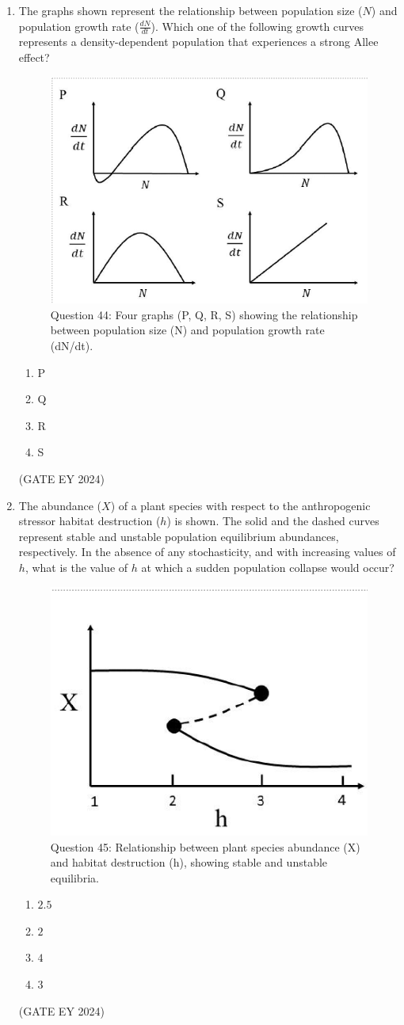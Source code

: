 \documentclass[journal]{IEEEtran}
\begin{document}
\begin{enumerate}
\item The graphs shown represent the relationship between population size ($N$) and population growth rate ($\frac{dN}{dt}$). Which one of the following growth curves represents a density-dependent population that experiences a strong Allee effect?
\begin{figure}[!ht]
    \centering
    \includegraphics[width=0.3\columnwidth]{figs/Q-44.png}
    \caption{Question 44: Four graphs (P, Q, R, S) showing the relationship between population size (N) and population growth rate (dN/dt).}
    \label{Q.44}
\end{figure}
    \begin{multicols}{4}
    \begin{enumerate}
        \item P
        \item Q
        \item R
        \item S
    \end{enumerate}
    \end{multicols}
\hfill{(GATE EY 2024)}

\item The abundance ($X$) of a plant species with respect to the anthropogenic stressor habitat destruction ($h$) is shown. The solid and the dashed curves represent stable and unstable population equilibrium abundances, respectively. In the absence of any stochasticity, and with increasing values of $h$, what is the value of $h$ at which a sudden population collapse would occur?
\begin{figure}[!ht]
    \centering
    \includegraphics[width=0.3\columnwidth]{figs/Q-45.png}
    \caption{Question 45: Relationship between plant species abundance (X) and habitat destruction (h), showing stable and unstable equilibria.}
    \label{Q.45}
\end{figure}
    \begin{multicols}{4}
    \begin{enumerate}
        \item $2.5$
        \item $2$
        \item $4$
        \item $3$
    \end{enumerate}
    \end{multicols}
\hfill{(GATE EY 2024)}


\end{enumerate}
\end{document}
